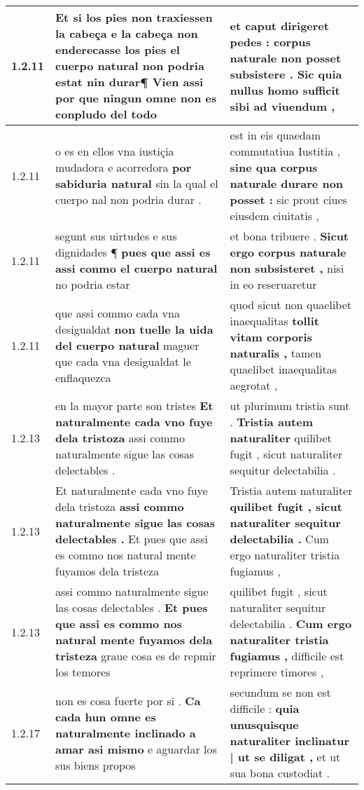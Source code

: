 \begin{tabular}{|p{1cm}|p{6.5cm}|p{6.5cm}|}
1.2.11 & Et si los pies non traxiessen la cabeça e la cabeça \textbf{ non enderecasse los pies el cuerpo natural } non podria estat nin durar¶ Vien assi por que ningun omne non es conpludo del todo & et caput dirigeret pedes : \textbf{ corpus naturale non posset subsistere . } Sic quia nullus homo sufficit sibi ad viuendum , \\\hline
1.2.11 & o es en ellos vna iustiçia mudadora e acorredora \textbf{ por sabiduria natural } sin la qual el cuerpo nal non podria durar . & est in eis quaedam commutatiua Iustitia , \textbf{ sine qua corpus naturale durare non posset : } sic prout ciues eiusdem ciuitatis , \\\hline
1.2.11 & segunt sus uirtudes e sus dignidades ¶ \textbf{ pues que assi es assi conmo el cuerpo natural } no podria estar & et bona tribuere . \textbf{ Sicut ergo corpus naturale non subsisteret , } nisi in eo reseruaretur \\\hline
1.2.11 & que assi commo cada vna desigualdat \textbf{ non tuelle la uida del cuerpo natural } maguer que cada vna desigualdat le enflaquezca & quod sicut non quaelibet inaequalitas \textbf{ tollit vitam corporis naturalis , } tamen quaelibet inaequalitas aegrotat , \\\hline
1.2.13 & en la mayor parte son tristes \textbf{ Et naturalmente cada vno fuye dela tristoza } assi commo naturalmente sigue las cosas delectables . & ut plurimum tristia sunt . \textbf{ Tristia autem naturaliter } quilibet fugit , sicut naturaliter sequitur delectabilia . \\\hline
1.2.13 & Et naturalmente cada vno fuye dela tristoza \textbf{ assi commo naturalmente sigue las cosas delectables . } Et pues que assi es commo nos natural mente fuyamos dela tristeza & Tristia autem naturaliter \textbf{ quilibet fugit , sicut naturaliter sequitur delectabilia . } Cum ergo naturaliter tristia fugiamus , \\\hline
1.2.13 & assi commo naturalmente sigue las cosas delectables . \textbf{ Et pues que assi es commo nos natural mente fuyamos dela tristeza } graue cosa es de repmir los temores & quilibet fugit , sicut naturaliter sequitur delectabilia . \textbf{ Cum ergo naturaliter tristia fugiamus , } difficile est reprimere timores , \\\hline
1.2.17 & non es cosa fuerte por si . \textbf{ Ca cada hun omne es naturalmente inclinado a amar asi mismo } e aguardar los sus biens propos & secundum se non est difficile : \textbf{ quia unusquisque naturaliter inclinatur | ut se diligat , } et ut sua bona custodiat . \\\hline

\end{tabular}
